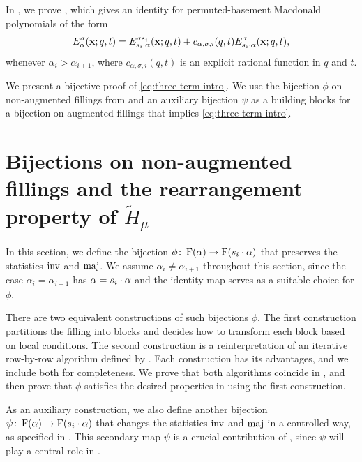 In ,
we prove , which gives an identity for permuted-basement Macdonald polynomials of the form
\begin{equation} \label{eq:three-term-intro}
    E_\alpha^\sigma(\mathbf{x}; q, t)
    =
    E_{s_i \cdot \alpha}^{\sigma s_i}(\mathbf{x}; q, t)
    +
    c_{\alpha, \sigma, i}(q, t) E_{s_i \cdot \alpha}^\sigma(\mathbf{x}; q, t),
\end{equation}
whenever \(\alpha_i > \alpha_{i+1}\), where \(c_{\alpha, \sigma, i}(q, t)\) is an explicit rational function in \(q\) and \(t\).

We present a bijective proof of \eqref{eq:three-term-intro}.
We use the bijection \(\phi\) on non-augmented fillings from  and an auxiliary bijection \(\psi\) as a building blocks for a bijection on augmented fillings that implies \eqref{eq:three-term-intro}.

\section{Bijections on non-augmented fillings and the rearrangement property of \texorpdfstring{\(\tilde{H}_\mu\)}{H̃μ}} \label{sec:bijective-non-augmented}

In this section, we define the bijection \(\phi \colon \Fill(\alpha) \to \Fill(s_i \permact \alpha)\) that preserves the statistics \(\inv\) and \(\maj\).
We assume \(\alpha_i \neq \alpha_{i+1}\) throughout this section, since the case \(\alpha_i = \alpha_{i+1}\) has \(\alpha = s_i \cdot \alpha\) and the identity map serves as a suitable choice for \(\phi\).

There are two equivalent constructions of such bijections \(\phi\).
The first construction partitions the filling into blocks and decides how to transform each block based on local conditions.
The second construction is a reinterpretation of an iterative row-by-row algorithm defined by \citeauthor{KLO22} \cite{KLO22}.
Each construction has its advantages, and we include both for completeness.
We prove that both algorithms coincide in ,
and then prove that \(\phi\) satisfies the desired properties in  using the first construction.

As an auxiliary construction,
we also define another bijection \(\psi \colon \Fill(\alpha) \to \Fill(s_i \permact \alpha)\) that changes the statistics \(\inv\) and \(\maj\) in a controlled way, as specified in .
This secondary map \(\psi\) is a crucial contribution of \cite{KLO22}, since \(\psi\) will play a central role in .

